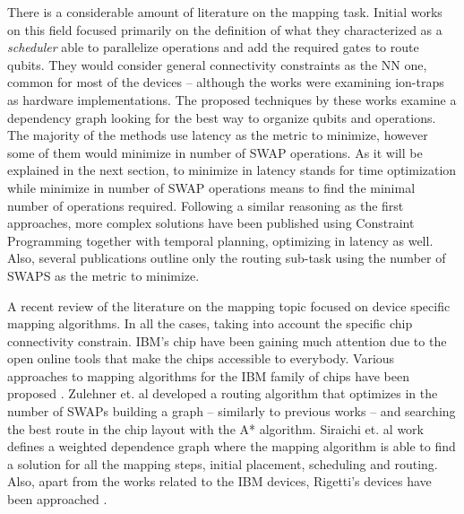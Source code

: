 There is a considerable amount of literature on the mapping task.
Initial works on this field \cite{Metodi_2006,Whitney_2007,Bahreini_2015} focused primarily on the definition of what they characterized as a \emph{scheduler} able to parallelize operations and add the required gates to route qubits.
They would consider general connectivity constraints as the NN one, common for most of the devices -- although the works were examining ion-traps as hardware implementations.
The proposed techniques by these works examine a dependency graph looking for the best way to organize qubits and operations.
The majority of the methods use latency as the metric to minimize, however some of them \cite{Farghadan_2017} would minimize in number of SWAP operations.
As it will be explained in the next section, to minimize in latency stands for time optimization while minimize in number of SWAP operations means to find the minimal number of operations required.
Following a similar reasoning as the first approaches, more complex solutions \cite{booth18:compar_integ_const_progr_tempor} have been published using Constraint Programming together with temporal planning, optimizing in latency as well.
Also, several publications \cite{Lye_2015,Wille_2016} outline only the routing sub-task using the number of SWAPS as the metric to minimize.

A recent review of the literature on the mapping topic focused on device specific mapping algorithms.
In all the cases, taking into account the specific chip connectivity constrain.
IBM's chip have been gaining much attention due to the open online tools that make the chips accessible to everybody.
Various approaches to mapping algorithms for the IBM family of chips have been proposed \cite{zulehner17:effic_method_mappin_quant_circuit,Siraichi_2018,mckay18:qiskit_backen_specif_openq_openp_exper,Dueck_2018}.
Zulehner et. al \cite{zulehner17:effic_method_mappin_quant_circuit} developed a routing algorithm that optimizes in the number of SWAPs building a graph -- similarly to previous works --  and searching the best route in the chip layout with the A* algorithm.
Siraichi et. al \cite{Siraichi_2018} work defines a weighted dependence graph where the mapping algorithm is able to find a solution for all the mapping steps, initial placement, scheduling and routing.
Also, apart from the works related to the IBM devices, Rigetti's devices have been approached \cite{Venturelli_2018}.

